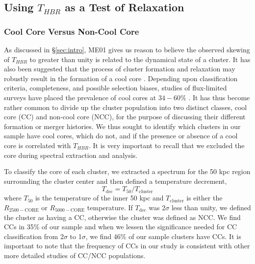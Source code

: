 \documentclass[12pt,preprint]{aastex}
\begin{document}
\subsection{Using $T_{HBR}$ as a Test of Relaxation} \label{sec:relax}

\subsubsection{Cool Core Versus Non-Cool Core}\label{sec:ccncc}

As discussed in \S\ref{sec:intro}, ME01 gives us reason to believe the
observed skewing of $T_{HBR}$ to greater than unity is related to the
dynamical state of a cluster. It has also been suggested that the
process of cluster formation and relaxation may robustly result in
the formation of a cool core
\citep{2006ApJ...640..673O,2007arXiv0708.1954B}. Depending upon
classification criteria, completeness, and possible selection biases,
studies of flux-limited surveys have placed the prevalence of cool
cores at $34-60\%$ \citep{1997MNRAS.292..419W, 1998MNRAS.298..416P,
2005MNRAS.359.1481B, 2007A&A...466..805C}. It has thus become rather
common to divide up the cluster population into two distinct classes,
cool core (CC) and non-cool core (NCC), for the purpose of discussing
their different formation or merger histories. We thus sought to
identify which clusters in our sample have cool cores, which do not,
and if the presence or absence of a cool core is correlated with
$T_{HBR}$. It is very important to recall that we excluded the core
during spectral extraction and analysis.

To classify the core of each cluster, we extracted a spectrum for the
50 kpc region surrounding the cluster center and then defined a
temperature decrement,
\begin{equation}
T_{\mathrm{dec}} = T_{50}/T_{\mathrm{cluster}}
\label{eqn:tdec}
\end{equation}
where $T_{50}$ is the temperature of the inner 50 kpc and
$T_{\mathrm{cluster}}$ is either the $R_{2500-\mathrm{CORE}}$ or
$R_{5000-\mathrm{CORE}}$ temperature. If $T_{\mathrm{dec}}$ was
2$\sigma$ less than unity, we defined the cluster as having a CC,
otherwise the cluster was defined as NCC. We find CCs in 35\% of our
sample and when we lessen the significance needed for CC
classification from 2$\sigma$ to 1$\sigma$, we find 46\% of our sample
clusters have CCs. It is important to note that the frequency of CCs
in our study is consistent with other more detailed studies of CC/NCC
populations.
\end{document}
